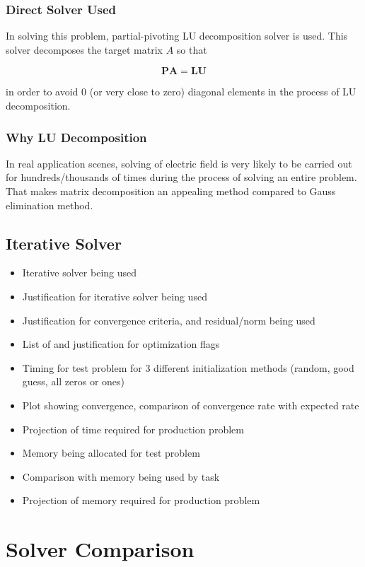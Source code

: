\documentclass{article}
\begin{document}
\begin{spacing}{1.1}
\subsubsection{Direct Solver Used}

In solving this problem, partial-pivoting LU decomposition solver is used. This solver decomposes the target matrix $A$ so that

\[\mathbf{PA = LU}\]

in order to avoid 0 (or very close to zero) diagonal elements in the process of LU decomposition.

\subsubsection{Why LU Decomposition}

In real application scenes, solving of electric field is very likely to be carried out for hundreds/thousands of times during the process of solving an entire problem. That makes matrix decomposition an appealing method compared to Gauss elimination method.

\subsection{Iterative Solver}

\begin{itemize}
    \item Iterative solver being used 
    \item Justification for iterative solver being used
    \item Justification for convergence criteria, and residual/norm being used
    \item List of and justification for optimization flags 
    \item Timing for test problem for 3 different initialization methods (random, good guess, all zeros or ones)
    \item Plot showing convergence, comparison of convergence rate with expected rate
    \item Projection of time required for production problem
    \item Memory being allocated for test problem
    \item Comparison with memory being used by task
    \item Projection of memory required for production problem
\end{itemize}

\section{Solver Comparison}


\end{spacing}
\end{document}

